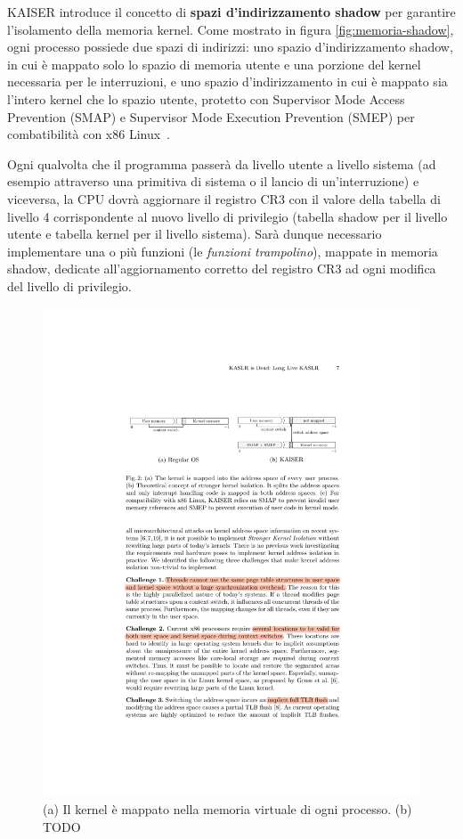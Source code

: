 KAISER introduce il concetto di \textbf{spazi d'indirizzamento shadow} per garantire l'isolamento della memoria kernel. 
Come mostrato in figura \vref{fig:memoria-shadow}, ogni processo possiede due spazi di indirizzi: uno spazio d'indirizzamento shadow, in cui è mappato solo lo spazio di memoria utente e una porzione del kernel necessaria per le interruzioni, e uno spazio d'indirizzamento in cui è mappato sia l'intero kernel che lo spazio utente, protetto con Supervisor Mode Access Prevention (SMAP) e Supervisor Mode Execution Prevention (SMEP) per combatibilità con x86 Linux~\cite{gruss:kaslr}.

Ogni qualvolta che il programma passerà da livello utente a livello sistema (ad esempio attraverso una primitiva di sistema o il lancio di un'interruzione) e viceversa, la CPU dovrà aggiornare il registro CR3 con il valore della tabella di livello 4 corrispondente al nuovo livello di privilegio (tabella shadow per il livello utente e tabella kernel per il livello sistema). 
Sarà dunque necessario implementare una o più funzioni (le \emph{funzioni trampolino}), mappate in memoria shadow, dedicate all'aggiornamento corretto del registro CR3 ad ogni modifica del livello di privilegio.

\begin{figure}
	\centering
	\includegraphics[width=\textwidth]{"img/memoria-shadow.pdf"}
	\caption{(a) Il kernel è mappato nella memoria virtuale di ogni processo. (b) TODO}
	\label{fig:memoria-shadow}
\end{figure}

